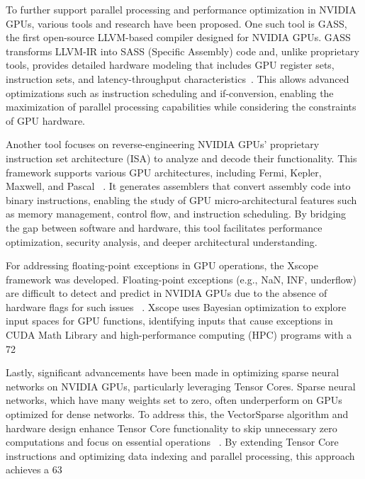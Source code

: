 To further support parallel processing and performance optimization in NVIDIA GPUs, various tools and research have been proposed. One such tool is GASS, the first open-source LLVM-based compiler designed for NVIDIA GPUs. GASS transforms LLVM-IR into SASS (Specific Assembly) code and, unlike proprietary tools, provides detailed hardware modeling that includes GPU register sets, instruction sets, and latency-throughput characteristics~\cite{Yan2022}. This allows advanced optimizations such as instruction scheduling and if-conversion, enabling the maximization of parallel processing capabilities while considering the constraints of GPU hardware.

Another tool focuses on reverse-engineering NVIDIA GPUs' proprietary instruction set architecture (ISA) to analyze and decode their functionality. This framework supports various GPU architectures, including Fermi, Kepler, Maxwell, and Pascal ~\cite{Hayes2019}. It generates assemblers that convert assembly code into binary instructions, enabling the study of GPU micro-architectural features such as memory management, control flow, and instruction scheduling. By bridging the gap between software and hardware, this tool facilitates performance optimization, security analysis, and deeper architectural understanding.

For addressing floating-point exceptions in GPU operations, the Xscope framework was developed. Floating-point exceptions (e.g., NaN, INF, underflow) are difficult to detect and predict in NVIDIA GPUs due to the absence of hardware flags for such issues ~\cite{Laguna2022}. Xscope uses Bayesian optimization to explore input spaces for GPU functions, identifying inputs that cause exceptions in CUDA Math Library and high-performance computing (HPC) programs with a 72%

Lastly, significant advancements have been made in optimizing sparse neural networks on NVIDIA GPUs, particularly leveraging Tensor Cores. Sparse neural networks, which have many weights set to zero, often underperform on GPUs optimized for dense networks. To address this, the VectorSparse algorithm and hardware design enhance Tensor Core functionality to skip unnecessary zero computations and focus on essential operations ~\cite{Zhu2019}. By extending Tensor Core instructions and optimizing data indexing and parallel processing, this approach achieves a 63%
